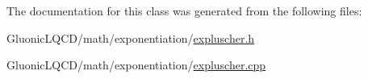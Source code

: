 The documentation for this class was generated from the following files\+:\begin{DoxyCompactItemize}
\item 
Gluonic\+L\+Q\+C\+D/math/exponentiation/\mbox{\hyperlink{expluscher_8h}{expluscher.\+h}}\item 
Gluonic\+L\+Q\+C\+D/math/exponentiation/\mbox{\hyperlink{expluscher_8cpp}{expluscher.\+cpp}}\end{DoxyCompactItemize}
